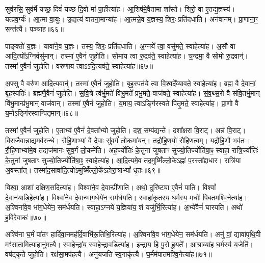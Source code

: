 सुव॑रसि॒ सुव॑र्मे यच्छ॒ दिवं॑ यच्छ दि॒वो मा॑ पा॒हीत्या॑ह। 
आ॒शिष॑मे॒वैतामा शा᳚स्ते। 
शिरो॒ वा ए॒तद्य॒ज्ञस्य॑। 
यत्प्र॑व॒र्ग्यः॑। 
आ॒त्मा वा॒युः। 
उ॒द्यत्य॑ वातना॒मान्या॑ह। 
आ॒त्मन्ने॒व य॒ज्ञस्य॒ शिरः॒ प्रति॑दधाति। 
अन॑वानम्। 
प्रा॒णाना॒ꣳ॒ सन्त॑त्यै। 
पञ्चा॑ह॥६६॥

पाङ्क्तो॑ य॒ज्ञः। 
यावा॑ने॒व य॒ज्ञः। 
तस्य॒ शिरः॒ प्रति॑दधाति। 
अ॒ग्नये᳚ त्वा॒ वसु॑मते॒ स्वाहेत्या॑ह। 
अ॒सौ वा आ॑दि॒त्यो᳚\-ऽग्निर्वसु॑\-मान्। 
तस्मा॑ ए॒वैनं॑ जुहोति। 
सोमा॑य त्वा रु॒द्रव॑ते॒ स्वाहेत्या॑ह। 
च॒न्द्रमा॒ वै सोमो॑ रु॒द्रवान्॑। 
तस्मा॑ ए॒वैनं॑ जुहोति। 
वरु॑णाय त्वाऽऽदि॒त्यव॑ते॒ स्वाहेत्या॑ह॥६७॥

अ॒फ्सु वै वरु॑ण आदि॒त्यवान्॑। 
तस्मा॑ ए॒वैनं॑ जुहोति। 
बृह॒स्पत॑ये त्वा वि॒श्वदे᳚व्यावते॒ स्वाहेत्या॑ह। 
ब्रह्म॒ वै दे॒वानां॒ बृह॒स्पतिः॑। 
ब्रह्म॑णै॒वैनं॑ जुहोति। 
स॒वि॒त्रे त्व॑र्भु॒मते॑ विभु॒मते᳚ प्रभु॒मते॒ वाज॑वते॒ स्वाहेत्या॑ह। 
सं॒व॒थ्स॒रो वै स॑वि॒तर्भु॒मान् वि॑भु॒मान्प्र॑भु॒मान् वाज॑वान्। 
तस्मा॑ ए॒वैनं॑ जुहोति। 
य॒माय॒ त्वाऽङ्गि॑रस्वते पितृ॒मते॒ स्वाहेत्या॑ह। 
प्रा॒णो वै य॒मोऽङ्गि॑रस्वान्पितृ॒मान्॥६८॥

तस्मा॑ ए॒वैनं॑ जुहोति। 
ए॒ताभ्य॑ ए॒वैनं॑ दे॒वता᳚भ्यो जुहोति। 
दश॒ सम्प॑द्यन्ते। 
दशा᳚क्षरा वि॒राट्। 
अन्नं॑  वि॒राट्। 
वि॒राजै॒वान्नाद्य॒मव॑रुन्धे। 
रौ॒हि॒णाभ्यां॒ वै दे॒वाः सु॑व॒र्गं॑ लो॒कमा॑यन्। 
तद्रौ॑हि॒णयो॑ रौहिण॒त्वम्। 
यद्रौ॑हि॒णौ भव॑तः। 
रौ॒हि॒णाभ्या॑मे॒व तद्यज॑मानः सुव॒र्गं लो॒कमे॑ति। 
अह॒र्ज्योतिः॑ के॒तुना॑ जुषताꣳ सुज्यो॒तिर्ज्योति॑षा॒ꣴ॒ स्वाहा॒ रात्रि॒र्ज्योतिः॑ के॒तुना॑ जुषताꣳ सुज्यो॒तिर्ज्योति॑षा॒ꣴ॒ स्वाहेत्या॑ह। 
आ॒दि॒त्य\-मे॒व तद॒मुष्मिँ॑ल्लो॒केऽह्ना॑ प॒रस्ता᳚द्दाधार। 
रात्रि॑या अ॒वस्ता᳚त्। 
तस्मा॑द॒सावा॑दि॒त्यो॑ऽमुष्मिँ॑ल्लो॒के॑ऽहोरा॒त्राभ्यां᳚ धृ॒तः॥६९॥
\anuvakamend[म॒नु॒ष्य॒ना॒मानि॑ प॒शवः॑ सीद॒त्वित्या॒हेन्द्रा॒येत्या॑हार्धयति घ्नन्ति गृह्णा॒त्यहिꣳ॑सायै॒ पञ्चा॑ऽहादि॒त्यव॑ते॒ स्वाहेत्या॑ह पितृ॒माने॑ति च॒त्वारि॑ च]

विश्वा॒ आशा॑ दक्षिण॒सदित्या॑ह। 
विश्वा॑ने॒व दे॒वान्प्री॑णाति। 
अथो॒ दुरि॑ष्ट्या ए॒वैनं॑ पाति। 
विश्वां᳚ दे॒वान॑याडि॒हेत्या॑ह। 
विश्वा॑ने॒व दे॒वान्भा॑ग॒धेये॑न॒ सम॑र्धयति। 
स्वाहा॑कृतस्य घ॒र्मस्य॒ मधोः᳚ पिबतमश्वि॒नेत्या॑ह। 
अ॒श्विना॑वे॒व भा॑ग॒धेये॑न॒ सम॑र्धयति। 
स्वाहा॒ऽग्नये॑ य॒ज्ञिया॑य॒ शं यजु॑र्भि॒रित्या॑ह। 
अ॒भ्ये॑वैनं॑ घारयति। 
अथो॑ ह॒विरे॒वाकः॑॥७०॥

अश्वि॑ना घ॒र्मं पा॑तꣳ हार्दिवा॒नमह॑र्दि॒वाभि॑रू॒तिभि॒रित्या॑ह। 
अ॒श्विना॑वे॒व भा॑ग॒धेये॑न॒ सम॑र्धयति। 
अनु॑ वां॒ द्यावा॑पृथि॒वी मꣳ॑साता॒मित्या॒हानु॑मत्यै। 
स्वाहेन्द्रा॑य॒ स्वाहेन्द्रा॒वडित्या॑ह। 
इन्द्रा॑य॒ हि पु॒रो हू॒यते᳚। 
आ॒श्राव्या॑ह घ॒र्मस्य॑ य॒जेति॑। 
वष॑ट्कृते जुहोति। 
रक्ष॑सा॒मप॑हत्यै। 
अनु॑यजति स्व॒गाकृ॑त्यै। 
घ॒र्मम॑पातमश्वि॒नेत्या॑ह॥७१॥

